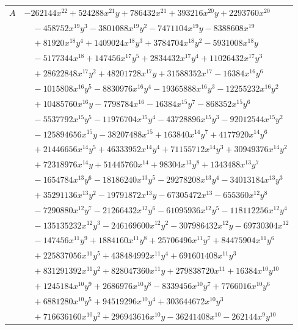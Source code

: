 \documentclass[11pt]{article}
\begin{document}
\begin{longtable}{@{}ll@{}}
$A$ & $-262144x^{22}+524288x^{21}y+786432x^{21}+393216x^{20}y+2293760x^{20}$\\
 & $\quad -458752x^{19}y^{3}-3801088x^{19}y^{2}-7471104x^{19}y-8388608x^{19}$\\
 & $\quad +81920x^{18}y^{4}+1409024x^{18}y^{3}+3784704x^{18}y^{2}-5931008x^{18}y$\\
 & $\quad -5177344x^{18}+147456x^{17}y^{5}+2834432x^{17}y^{4}+11026432x^{17}y^{3}$\\
 & $\quad +28622848x^{17}y^{2}+48201728x^{17}y+31588352x^{17}-16384x^{16}y^{6}$\\
 & $\quad -1015808x^{16}y^{5}-8830976x^{16}y^{4}-19365888x^{16}y^{3}-12255232x^{16}y^{2}$\\
 & $\quad +10485760x^{16}y-7798784x^{16}-16384x^{15}y^{7}-868352x^{15}y^{6}$\\
 & $\quad -5537792x^{15}y^{5}-11976704x^{15}y^{4}-43728896x^{15}y^{3}-92012544x^{15}y^{2}$\\
 & $\quad -125894656x^{15}y-38207488x^{15}+163840x^{14}y^{7}+4177920x^{14}y^{6}$\\
 & $\quad +21446656x^{14}y^{5}+46333952x^{14}y^{4}+71155712x^{14}y^{3}+30949376x^{14}y^{2}$\\
 & $\quad +72318976x^{14}y+51445760x^{14}+98304x^{13}y^{8}+1343488x^{13}y^{7}$\\
 & $\quad -1654784x^{13}y^{6}-18186240x^{13}y^{5}-29278208x^{13}y^{4}-34013184x^{13}y^{3}$\\
 & $\quad +35291136x^{13}y^{2}-19791872x^{13}y-67305472x^{13}-655360x^{12}y^{8}$\\
 & $\quad -7290880x^{12}y^{7}-21266432x^{12}y^{6}-61095936x^{12}y^{5}-118112256x^{12}y^{4}$\\
 & $\quad -135135232x^{12}y^{3}-246169600x^{12}y^{2}-307986432x^{12}y-69730304x^{12}$\\
 & $\quad -147456x^{11}y^{9}+1884160x^{11}y^{8}+25706496x^{11}y^{7}+84475904x^{11}y^{6}$\\
 & $\quad +225837056x^{11}y^{5}+438484992x^{11}y^{4}+691601408x^{11}y^{3}$\\
 & $\quad +831291392x^{11}y^{2}+828047360x^{11}y+279838720x^{11}+16384x^{10}y^{10}$\\
 & $\quad +1245184x^{10}y^{9}+2686976x^{10}y^{8}-8339456x^{10}y^{7}+7766016x^{10}y^{6}$\\
 & $\quad +6881280x^{10}y^{5}+94519296x^{10}y^{4}+303644672x^{10}y^{3}$\\
 & $\quad +716636160x^{10}y^{2}+296943616x^{10}y-36241408x^{10}-262144x^{9}y^{10}$\\

\end{longtable}
\end{document}
